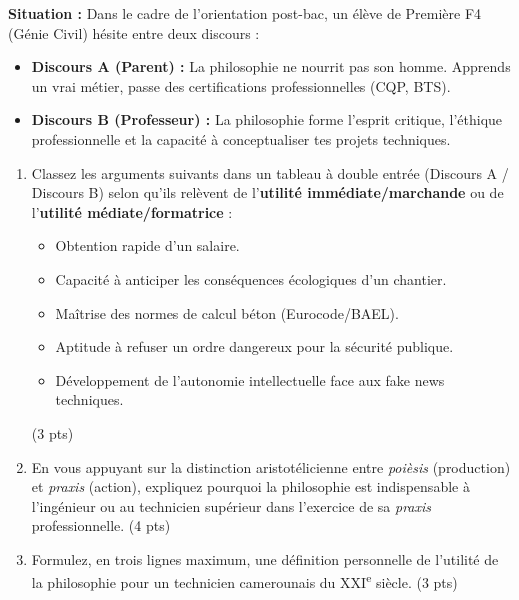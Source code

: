 \documentclass[11pt]{article}
\begin{document}
\begin{exercice}
\textbf{Situation :} Dans le cadre de l'orientation post-bac, un élève de Première F4 (Génie Civil) hésite entre deux discours :
\begin{itemize}
    \item \textbf{Discours A (Parent) :} \og{}La philosophie ne nourrit pas son homme. Apprends un vrai métier, passe des certifications professionnelles (CQP, BTS).\fg{}
    \item \textbf{Discours B (Professeur) :} \og{}La philosophie forme l'esprit critique, l'éthique professionnelle et la capacité à conceptualiser tes projets techniques.\fg{}
\end{itemize}

\begin{enumerate}
    \item Classez les arguments suivants dans un tableau à double entrée (Discours A / Discours B) selon qu'ils relèvent de l'\textbf{utilité immédiate/marchande} ou de l'\textbf{utilité médiate/formatrice} :
    \begin{itemize}
        \item Obtention rapide d'un salaire.
        \item Capacité à anticiper les conséquences écologiques d'un chantier.
        \item Maîtrise des normes de calcul béton (Eurocode/BAEL).
        \item Aptitude à refuser un ordre dangereux pour la sécurité publique.
        \item Développement de l'autonomie intellectuelle face aux fake news techniques.
    \end{itemize} (3 pts)
    \item En vous appuyant sur la distinction aristotélicienne entre \textit{poièsis} (production) et \textit{praxis} (action), expliquez pourquoi la philosophie est indispensable à l'ingénieur ou au technicien supérieur dans l'exercice de sa \textit{praxis} professionnelle. (4 pts)
    \item Formulez, en trois lignes maximum, une définition personnelle de l'\og{}utilité\fg{} de la philosophie pour un technicien camerounais du XXI\textsuperscript{e} siècle. (3 pts)
\end{enumerate}
\end{exercice}
\end{document}
